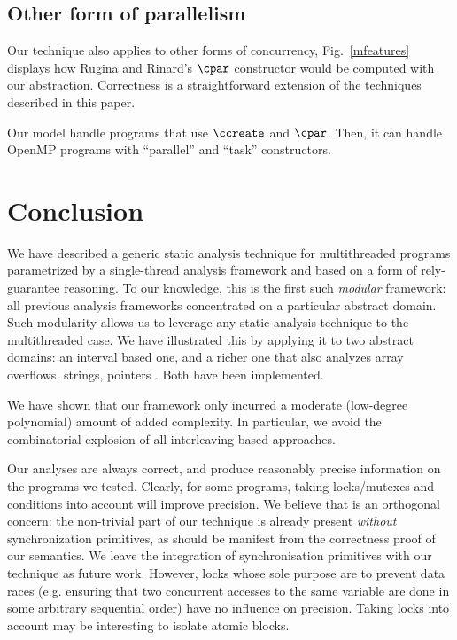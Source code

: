 \documentclass[12pt]{article}
\begin{document}
\subsection{Other form of parallelism}\label{improvement}


Our technique also applies to other forms of concurrency, Fig.~\ref{mfeatures} displays how Rugina and Rinard's \(\cpar\) constructor \citerinard{} would be computed with our abstraction. Correctness is a straightforward extension of the techniques described in this paper.

Our model handle programs that use \(\ccreate\) and \(\cpar\). Then, it can handle OpenMP programs with ``parallel'' and ``task'' constructors.


\extendedsyntax

\section{Conclusion}\label{section:conclusion}

We have described a generic static analysis technique for multithreaded programs parametrized by a single-thread analysis framework and based on a form of rely-guarantee reasoning. To our knowledge, this is the first such \emph{modular} framework: all previous analysis frameworks concentrated on a particular abstract domain. Such modularity allows us to leverage any static analysis technique to the multithreaded case. We have illustrated this by applying it to two abstract domains: an interval based one, and a richer one that also analyzes array overflows, strings, pointers \cite{AllamigeonGodardHymansSAS06}. Both have been implemented.

We have shown that our framework only incurred a moderate (low-degree polynomial) amount of added complexity. In particular, we avoid the combinatorial explosion of all interleaving based approaches.

Our analyses are always correct, and produce reasonably precise information on the programs we tested. Clearly, for some programs, taking locks/mutexes and conditions into account will improve precision. We believe that is an orthogonal concern: the non-trivial part of our technique is already present \emph{without} synchronization primitives, as should be manifest from the correctness proof of our \cname semantics. We leave the integration of synchronisation primitives with our technique as future work. However, locks whose sole purpose are to prevent data races (e.g. ensuring that two concurrent accesses to the same variable are done in some arbitrary sequential order) have no influence on precision. Taking locks into account may be interesting to isolate atomic blocks.
\end{document}
